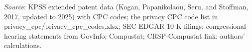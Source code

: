 \begin{table}[htbp]
\par\textit{Source}: KPSS extended patent data (Kogan, Papanikolaou, Seru, and Stoffman, 2017, updated to 2025) with CPC codes; the privacy CPC code list in privacy_cpc/privacy_cpc_codes.xlsx; SEC EDGAR 10-K filings; congressional hearing statements from GovInfo; Compustat; CRSP-Compustat link; authors' calculations.
\end{table}
